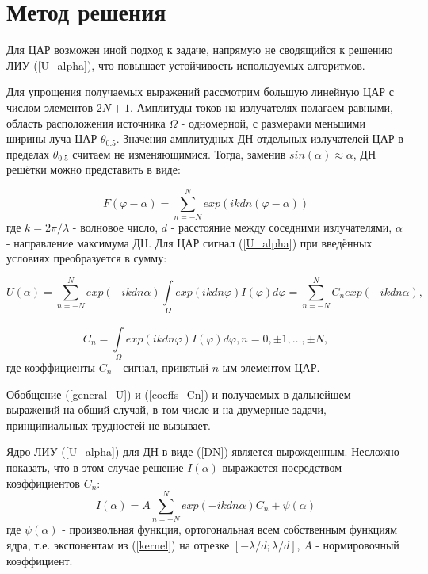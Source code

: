 \documentclass{article}
\begin{document}
	\section*{Метод решения}
	
	Для ЦАР возможен иной подход к задаче, напрямую не сводящийся к решению ЛИУ (\ref{U_alpha}), что повышает устойчивость используемых алгоритмов.
	
	Для упрощения получаемых выражений рассмотрим большую линейную ЦАР с числом элементов $2N + 1$. Амплитуды токов на излучателях полагаем равными, область расположения источника $\Omega$ - одномерной, с размерами меньшими ширины луча ЦАР $\theta_{0.5}$. Значения амплитудных ДН отдельных излучателей ЦАР в пределах $\theta_{0.5}$ считаем не изменяющимися. Тогда, заменив $sin(\alpha) \approx \alpha$, ДН решётки можно представить в виде:
	
	\begin{equation} \label{DN}
	F(\varphi - \alpha) = \sum\limits_{n=-N}^{N} exp(ikdn(\varphi - \alpha))
	\end{equation}
	где $k = 2\pi/\lambda$ - волновое число, $d$ - расстояние между соседними излучателями, $\alpha$ - направление максимума ДН. Для ЦАР сигнал (\ref{U_alpha}) при введённых условиях преобразуется в сумму:
	
	\begin{equation} \label{general_U}
	U(\alpha) = \sum_{n=-N}^{N}exp(-ikdn\alpha)\int\limits_{\Omega}^{}exp(ikdn\varphi)I(\varphi)d\varphi=\sum\limits_{n=-N}^{N}C_n exp(-ikdn\alpha),
	\end{equation}

	\begin{equation} \label{coeffs_Cn}
	C_n = \int\limits_{\Omega}^{} exp(ikdn\varphi)I(\varphi)d\varphi, n = 0, \pm 1, \dots, \pm N, 
	\end{equation}
	где коэффициенты $C_n$ - сигнал, принятый $n$-ым элементом ЦАР.
	
	Обобщение (\ref{general_U}) и (\ref{coeffs_Cn}) и получаемых в дальнейшем выражений на общий случай, в том числе и на двумерные задачи, принципиальных трудностей не вызывает.
	
	Ядро ЛИУ (\ref{U_alpha}) для ДН в виде (\ref{DN}) является вырожденным. Несложно показать, что в этом случае решение $I(\alpha)$ выражается посредством коэффициентов $C_n$:
	\begin{equation} \label{kernel}
			I(\alpha) = A\sum_{n=-N}^{N} exp(-ikdn\alpha)C_n + \psi(\alpha)
	\end{equation}
	где $\psi(\alpha)$ - произвольная функция, ортогональная всем собственным функциям ядра, т.е. экспонентам из (\ref{kernel}) на отрезке $[-\lambda/d;\lambda/d]$, $A$ - нормировочный коэффициент.
	
\end{document}
